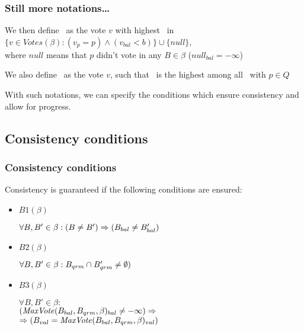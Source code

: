 \documentclass[10 pt]{beamer}
\begin{document}
\begin{frame}
  \frametitle{Still more notations\ldots}

  We then define \maxvotep\ as the vote $v$ with highest \vbal\ in 
 $\{v \in Votes(\beta) : (v_p = p) \wedge (v_{bal} < b)\} \cup \{null\}$,\\
 where $null$ means that $p$ didn't vote in any $B \in \beta$ ($null_{bal} = -\infty$)

  \vspace{4 mm}
  We also define \maxvoteq\ as the vote $v$, such that \vbal\ is the highest among all \maxvotep\ with $p \in Q$

  \vspace{8 mm}
  {\small With such notations, we can specify the conditions which ensure consistency and allow for progress.}

\end{frame}

\subsection{Consistency conditions}


\begin{frame}
  \frametitle{Consistency conditions}

  Consistency is guaranteed if the following conditions are ensured:

  \begin{itemize}
    \item $B1(\beta)$
    
    $\forall B, B' \in \beta : (B \neq B') \Rightarrow (B_{bal} \neq B'_{bal})$

    \vspace{4 mm}
    \item $B2(\beta)$ %
  
    $\forall B, B' \in \beta : B_{qrm} \cap B'_{qrm} \neq \emptyset)$
    
    \vspace{4 mm}
    \item $B3(\beta)$
  
    $\forall B, B' \in \beta :$\\
    $(\text{\textit{MaxVote}}(B_{bal}, B_{qrm}, \beta)_{bal} \neq -\infty) \Rightarrow$\\
    $\Rightarrow (B_{val} = \text{\textit{MaxVote}}(B_{bal}, B_{qrm}, \beta)_{val})$
  \end{itemize}

\end{frame}
\end{document}
